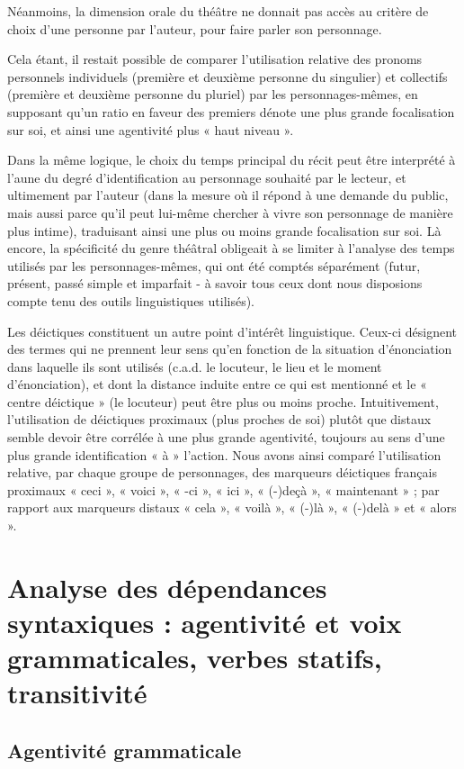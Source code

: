 Néanmoins, la dimension orale du théâtre ne donnait pas accès au critère de choix d’une personne par l'auteur, pour faire parler son personnage. 

Cela étant, il restait possible de comparer l'utilisation relative des pronoms personnels individuels (première et deuxième personne du singulier) et collectifs (première et deuxième personne du pluriel) par les personnages-mêmes, en supposant qu'un ratio en faveur des premiers dénote une plus grande focalisation sur soi, et ainsi une agentivité plus « haut niveau ». 

Dans la même logique, le choix du temps principal du récit peut être interprété à l'aune du degré d'identification au personnage souhaité par le lecteur, et ultimement par l'auteur (dans la mesure où il répond à une demande du public, mais aussi parce qu'il peut lui-même chercher à vivre son personnage de manière plus intime), traduisant ainsi une plus ou moins grande focalisation sur soi. Là encore, la spécificité du genre théâtral obligeait à se limiter à l'analyse des temps utilisés par les personnages-mêmes, qui ont été comptés séparément (futur, présent, passé simple et imparfait - à savoir tous ceux dont nous disposions compte tenu des outils linguistiques utilisés).

Les déictiques constituent un autre point d'intérêt linguistique. Ceux-ci désignent des termes qui ne prennent leur sens qu'en fonction de la situation d'énonciation dans laquelle ils sont utilisés (c.a.d. le locuteur, le lieu et le moment d'énonciation), et dont la distance induite entre ce qui est mentionné et le « centre déictique » (le locuteur) peut être plus ou moins proche. Intuitivement, l'utilisation de déictiques proximaux (plus proches de soi) plutôt que distaux semble devoir être corrélée à une plus grande agentivité, toujours au sens d'une plus grande identification « à » l'action. Nous avons ainsi comparé l'utilisation relative, par chaque groupe de personnages, des marqueurs déictiques français proximaux « ceci », « voici », « -ci », « ici », « (-)deçà », « maintenant » ; par rapport aux marqueurs distaux « cela », « voilà », « (-)là », « (-)delà » et « alors ». 

\section{Analyse des dépendances syntaxiques : agentivité et voix grammaticales, verbes statifs, transitivité}

\subsection{Agentivité grammaticale}

